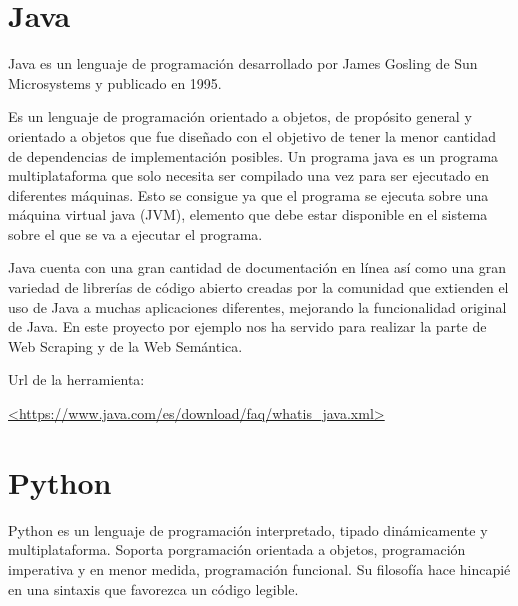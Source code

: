 

\section{Java}

Java es un lenguaje de programación desarrollado por James Gosling de Sun Microsystems y publicado en 1995.

Es un lenguaje de programación orientado a objetos, de propósito general y orientado a objetos que fue diseñado con el objetivo de tener la menor cantidad de dependencias de implementación posibles. Un programa java es un programa multiplataforma que solo necesita ser compilado una vez para ser ejecutado en diferentes máquinas. Esto se consigue ya que el programa se ejecuta sobre una máquina virtual java (JVM), elemento que debe estar disponible en el sistema sobre el que se va a ejecutar el programa.

Java cuenta con una gran cantidad de documentación en línea así como una gran variedad de librerías de código abierto creadas por la comunidad que extienden el uso de Java a muchas aplicaciones diferentes, mejorando la funcionalidad original de Java. En este proyecto por ejemplo nos ha servido para realizar la parte de Web Scraping y de la Web Semántica.

Url de la herramienta:

\url{<https://www.java.com/es/download/faq/whatis_java.xml>}

\section{Python}

Python es un lenguaje de programación  interpretado, tipado dinámicamente y multiplataforma. Soporta porgramación orientada a objetos, programación imperativa y en menor medida, programación funcional. Su filosofía hace hincapié en una sintaxis que favorezca un código legible.\cite{wiki:python}

